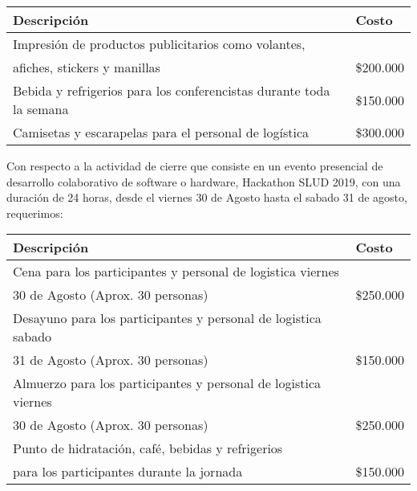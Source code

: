 \begin{table}
\begin{center}
\begin{tabular}{|l|l|}
\hline
Descripción & Costo \\
\hline \hline
Impresión de productos publicitarios como volantes, \\  afiches, stickers y manillas  & \$200.000 \\ \hline
Bebida y refrigerios para los conferencistas durante toda la semana & \$150.000 \\ \hline
Camisetas y escarapelas para el personal de log\'istica &  \$300.000 \\ \hline
\end{tabular}
\end{center}
\end{table}


Con respecto a la actividad de cierre que consiste en un evento presencial de desarrollo colaborativo de software o hardware, Hackathon SLUD 2019, con una duraci\'on de 24 horas, desde el viernes 30 de Agosto hasta el sabado 31 de agosto, requerimos: 

\begin{table}
\begin{center}
\begin{tabular}{|l|l|}
\hline
Descripción & Costo \\
\hline \hline
Cena para los participantes y personal de logistica  viernes \\ 30 de Agosto (Aprox. 30 personas) & \$250.000 \\ \hline
Desayuno para los participantes y personal de logistica  sabado \\ 31 de Agosto (Aprox. 30 personas) & \$150.000 \\ \hline
Almuerzo para los participantes y personal de logistica  viernes \\ 30 de Agosto (Aprox. 30 personas) & \$250.000 \\ \hline
Punto de hidrataci\'on, caf\'e, bebidas y refrigerios \\ para los participantes durante la jornada & \$150.000 \\ \hline

\end{tabular}
\end{center}
\end{table}

